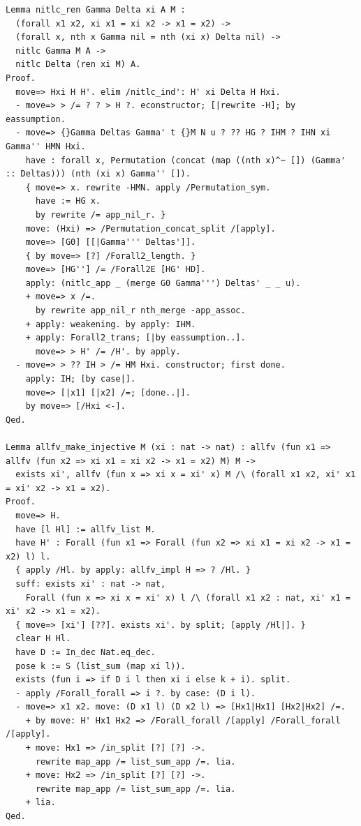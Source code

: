 \documentclass[10pt,a4paper]{article}
\begin{document}
\begin{lstlisting}[style=authorcoq]
Lemma nitlc_ren Gamma Delta xi A M :
  (forall x1 x2, xi x1 = xi x2 -> x1 = x2) ->
  (forall x, nth x Gamma nil = nth (xi x) Delta nil) ->
  nitlc Gamma M A ->
  nitlc Delta (ren xi M) A.
Proof.
  move=> Hxi H H'. elim /nitlc_ind': H' xi Delta H Hxi.
  - move=> > /= ? ? > H ?. econstructor; [|rewrite -H]; by eassumption.
  - move=> {}Gamma Deltas Gamma' t {}M N u ? ?? HG ? IHM ? IHN xi Gamma'' HMN Hxi.
    have : forall x, Permutation (concat (map ((nth x)^~ []) (Gamma' :: Deltas))) (nth (xi x) Gamma'' []).
    { move=> x. rewrite -HMN. apply /Permutation_sym.
      have := HG x.
      by rewrite /= app_nil_r. }
    move: (Hxi) => /Permutation_concat_split /[apply].
    move=> [G0] [[|Gamma''' Deltas']].
    { by move=> [?] /Forall2_length. }
    move=> [HG''] /= /Forall2E [HG' HD].
    apply: (nitlc_app _ (merge G0 Gamma''') Deltas' _ _ u).
    + move=> x /=.
      by rewrite app_nil_r nth_merge -app_assoc.
    + apply: weakening. by apply: IHM.
    + apply: Forall2_trans; [|by eassumption..].
      move=> > H' /= /H'. by apply.
  - move=> > ?? IH > /= HM Hxi. constructor; first done.
    apply: IH; [by case|].
    move=> [|x1] [|x2] /=; [done..|].
    by move=> [/Hxi <-].
Qed.

Lemma allfv_make_injective M (xi : nat -> nat) : allfv (fun x1 => allfv (fun x2 => xi x1 = xi x2 -> x1 = x2) M) M ->
  exists xi', allfv (fun x => xi x = xi' x) M /\ (forall x1 x2, xi' x1 = xi' x2 -> x1 = x2).
Proof.
  move=> H.
  have [l Hl] := allfv_list M.
  have H' : Forall (fun x1 => Forall (fun x2 => xi x1 = xi x2 -> x1 = x2) l) l.
  { apply /Hl. by apply: allfv_impl H => ? /Hl. }
  suff: exists xi' : nat -> nat,
    Forall (fun x => xi x = xi' x) l /\ (forall x1 x2 : nat, xi' x1 = xi' x2 -> x1 = x2).
  { move=> [xi'] [??]. exists xi'. by split; [apply /Hl|]. }
  clear H Hl.
  have D := In_dec Nat.eq_dec.
  pose k := S (list_sum (map xi l)).
  exists (fun i => if D i l then xi i else k + i). split.
  - apply /Forall_forall => i ?. by case: (D i l).
  - move=> x1 x2. move: (D x1 l) (D x2 l) => [Hx1|Hx1] [Hx2|Hx2] /=.
    + by move: H' Hx1 Hx2 => /Forall_forall /[apply] /Forall_forall /[apply].
    + move: Hx1 => /in_split [?] [?] ->.
      rewrite map_app /= list_sum_app /=. lia.
    + move: Hx2 => /in_split [?] [?] ->.
      rewrite map_app /= list_sum_app /=. lia.
    + lia.
Qed.


\end{lstlisting}
\end{document}

